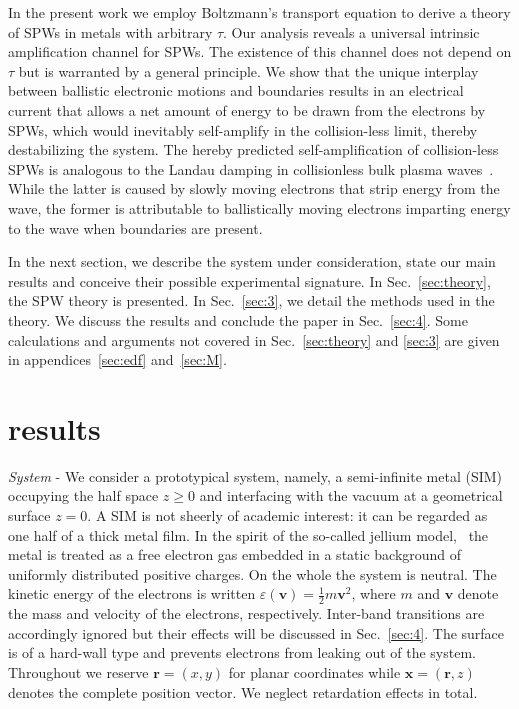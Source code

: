 \documentclass[aps,reprint]{revtex4-1}
\begin{document}
In the present work we employ Boltzmann's transport equation to derive a theory of SPWs in metals with arbitrary $\tau$. Our analysis reveals a universal intrinsic amplification channel for SPWs. The existence of this channel does not depend on $\tau$ but is warranted by a general principle. We show that the unique interplay between ballistic electronic motions and boundaries results in an electrical current that allows a net amount of energy to be drawn from the electrons by SPWs, which would inevitably self-amplify in the collision-less limit, thereby destabilizing the system. The hereby predicted self-amplification of collision-less SPWs is analogous to the Landau damping in collisionless bulk plasma waves~\cite{landau1946,wong1964,bingham1997,natu2013}. While the latter is caused by slowly moving electrons that strip energy from the wave, the former is attributable to ballistically moving electrons imparting energy to the wave when boundaries are present. 

In the next section, we describe the system under consideration, state our main results and conceive their possible experimental signature. In Sec.~\ref{sec:theory}, the SPW theory is presented. In Sec.~\ref{sec:3}, we detail the methods used in the theory. We discuss the results and conclude the paper in Sec.~\ref{sec:4}. Some calculations and arguments not covered in Sec.~\ref{sec:theory} and \ref{sec:3} are given in appendices~\ref{sec:edf} and~\ref{sec:M}. 

\section{results}
\label{sec:2}
\textit{System} - We consider a prototypical system, namely, a semi-infinite metal (SIM) occupying the half space $z\geq 0$ and interfacing with the vacuum at a geometrical surface $z=0$. A SIM is not sheerly of academic interest: it can be regarded as one half of a thick metal film. In the spirit of the so-called jellium model,~\cite{ziman1960,pines,abrikosov} the metal is treated as a free electron gas embedded in a static background of uniformly distributed positive charges. On the whole the system is neutral. The kinetic energy of the electrons is written $\varepsilon(\mathbf{v})=\frac{1}{2}m\mathbf{v}^2$, where $m$ and $\mathbf{v}$ denote the mass and velocity of the electrons, respectively. Inter-band transitions are accordingly ignored but their effects will be discussed in Sec.~\ref{sec:4}. The surface is of a hard-wall type and prevents electrons from leaking out of the system. Throughout we reserve $\mathbf{r}=(x,y)$ for planar coordinates while $\mathbf{x} = (\mathbf{r},z)$ denotes the complete position vector. We neglect retardation effects in total. 
\end{document}

